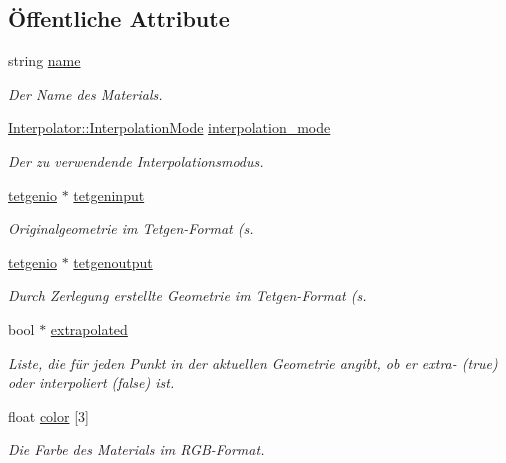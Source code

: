 \subsection*{Öffentliche Attribute}
\begin{DoxyCompactItemize}
\item 
string \hyperlink{structObjectData_1_1MaterialData_a795f1265218b9a125559bbe9231f3c8d}{name}
\begin{DoxyCompactList}\small\item\em Der Name des Materials. \end{DoxyCompactList}\item 
\hyperlink{classInterpolator_adb733b1439a2903feae57fa734ced0c2}{Interpolator\-::\-Interpolation\-Mode} \hyperlink{structObjectData_1_1MaterialData_a35d4f03b3af4349f69d5fed072118dca}{interpolation\-\_\-mode}
\begin{DoxyCompactList}\small\item\em Der zu verwendende Interpolationsmodus. \end{DoxyCompactList}\item 
\hyperlink{classtetgenio}{tetgenio} $\ast$ \hyperlink{structObjectData_1_1MaterialData_ab752395b4aedbe011fa49de7fbbd36ee}{tetgeninput}
\begin{DoxyCompactList}\small\item\em Originalgeometrie im Tetgen-\/\-Format (s. \end{DoxyCompactList}\item 
\hyperlink{classtetgenio}{tetgenio} $\ast$ \hyperlink{structObjectData_1_1MaterialData_a15d576cfe25abe334e34eb5e4671d6d7}{tetgenoutput}
\begin{DoxyCompactList}\small\item\em Durch Zerlegung erstellte Geometrie im Tetgen-\/\-Format (s. \end{DoxyCompactList}\item 
bool $\ast$ \hyperlink{structObjectData_1_1MaterialData_a22bff8a90f617a5485690bd017dcf701}{extrapolated}
\begin{DoxyCompactList}\small\item\em Liste, die für jeden Punkt in der aktuellen Geometrie angibt, ob er extra-\/ (true) oder interpoliert (false) ist. \end{DoxyCompactList}\item 
float \hyperlink{structObjectData_1_1MaterialData_a3930f8e673d50b88c9234c7f73c16a91}{color} \mbox{[}3\mbox{]}
\begin{DoxyCompactList}\small\item\em Die Farbe des Materials im R\-G\-B-\/\-Format. \end{DoxyCompactList}\item 

\end{DoxyCompactItemize}
